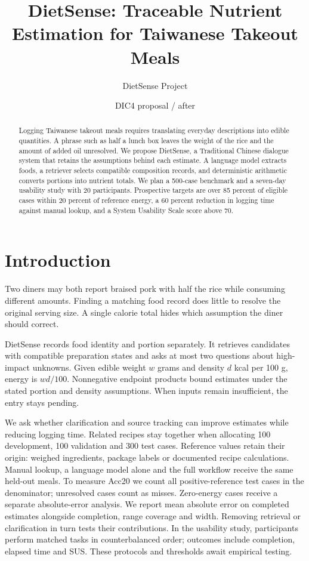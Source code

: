 \documentclass[11pt]{article}
\title{DietSense: Traceable Nutrient Estimation for Taiwanese Takeout Meals}
\author{DietSense Project}
\date{DIC4 proposal / after}
\begin{document}
\maketitle
\begin{abstract}
Logging Taiwanese takeout meals requires translating everyday descriptions into edible quantities. A phrase such as half a lunch box leaves the weight of the rice and the amount of added oil unresolved. We propose DietSense, a Traditional Chinese dialogue system that retains the assumptions behind each estimate. A language model extracts foods, a retriever selects compatible composition records, and deterministic arithmetic converts portions into nutrient totals. We plan a 500-case benchmark and a seven-day usability study with 20 participants. Prospective targets are over 85 percent of eligible cases within 20 percent of reference energy, a 60 percent reduction in logging time against manual lookup, and a System Usability Scale score above 70.\end{abstract}
\section{Introduction}
Two diners may both report braised pork with half the rice while consuming different amounts. Finding a matching food record does little to resolve the original serving size. A single calorie total hides which assumption the diner should correct.

DietSense records food identity and portion separately. It retrieves candidates with compatible preparation states and asks at most two questions about high-impact unknowns. Given edible weight $w$ grams and density $d$ kcal per 100 g, energy is $wd/100$. Nonnegative endpoint products bound estimates under the stated portion and density assumptions. When inputs remain insufficient, the entry stays pending.

We ask whether clarification and source tracking can improve estimates while reducing logging time. Related recipes stay together when allocating 100 development, 100 validation and 300 test cases. Reference values retain their origin: weighed ingredients, package labels or documented recipe calculations. Manual lookup, a language model alone and the full workflow receive the same held-out meals. To measure Acc20 we count all positive-reference test cases in the denominator; unresolved cases count as misses. Zero-energy cases receive a separate absolute-error analysis. We report mean absolute error on completed estimates alongside completion, range coverage and width. Removing retrieval or clarification in turn tests their contributions. In the usability study, participants perform matched tasks in counterbalanced order; outcomes include completion, elapsed time and SUS. These protocols and thresholds await empirical testing.
\end{document}

